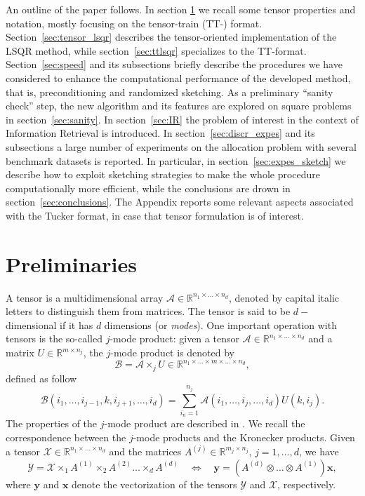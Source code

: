 \documentclass{siamart190516}
\newcommand{\cc}[1]{\mathcal{#1}}
\newcommand{\bx}{\bm x}
\newcommand{\by}{\bm y}
\newcommand{\cA}{\cc A}
\newcommand{\cX}{\cc X}
\newcommand{\cB}{\cc B}
\newcommand{\cY}{\cc Y}
\newcommand{\RR}{\mathbb R}
\begin{document}
An outline of the paper follows. 
In section \ref{sec:prel} we recall some tensor properties
and notation, mostly focusing on the
tensor-train (TT-) format.
Section~\ref{sec:tensor_lsqr} describes the tensor-oriented
implementation of the LSQR method, while section~\ref{sec:ttlsqr}
specializes to the TT-format. Section~\ref{sec:speed} and its subsections
briefly describe the procedures we have considered to enhance the 
computational performance of the developed method, that is, preconditioning and
randomized sketching.
 As a preliminary ``sanity check'' step, the new
algorithm and its features are explored on square problems in 
section~\ref{sec:sanity}.
In section~\ref{sec:IR} the problem of interest in the context of Information Retrieval is introduced. In section~\ref{sec:discr_expes} and its subsections
a large number of experiments on the allocation problem
with several benchmark datasets is reported.
In particular, in section~\ref{sec:expes_sketch} we describe how to exploit
sketching strategies to make the whole procedure computationally
more efficient, while the conclusions are drown in 
section~\ref{sec:conclusions}. The Appendix reports some
relevant aspects associated with the Tucker format, in case
that tensor formulation is of interest.


\section{Preliminaries}\label{sec:prel}
A tensor is a multidimensional array $\cA\in\RR^{n_1\times \dots \times n_d}$, denoted by capital italic letters to distinguish them from matrices. The tensor is said to be $d-$dimensional if it has $d$ dimensions (or \textit{modes}).
%
One important operation with tensors is the so-called $j$-mode product: given a tensor $\cA\in\RR^{n_1\times \dots\times n_d}$ and a matrix $U\in\RR^{m\times n_j}$, the $j$-mode product is denoted by
\[
\cB = \cA\times_j U\in\RR^{n_1\times\dots\times m\times\dots\times n_d},
\]
defined as follow
\[
\cB(i_1,\ldots,i_{j-1},k,i_{j+1},\ldots,i_d)=\sum_{i_n=1}^{n_j}\cA(i_1,\ldots,i_j,\ldots,i_d)U(k,i_j).
\]
The properties of the $j$-mode product are described in \cite{doi:10.1137/07070111X}. We recall the correspondence between the $j$-mode products and the Kronecker products. Given a tensor $\cX\in\RR^{n_1\times\dots\times n_d}$ and the matrices $A^{(j)}\in\RR^{m_j\times n_j}$, $j=1,\ldots,d$, we have
$$
\cY=\cX\times_1 A^{(1)}\times_2 A^{(2)} \dots \times_d A^{(d)}\quad\Leftrightarrow\quad
\by=(A^{(d)}\otimes \dots\otimes A^{(1)})\bx,
$$
where $\by$ and $\bx$ denote the vectorization of the tensors $\cY$ and $\cX$, respectively.
\end{document}
